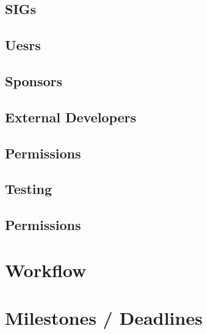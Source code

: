 \documentclass{article}
\begin{document}
\subsection{SIGs}
\subsection{Uesrs}
\subsection{Sponsors}
\subsection{External Developers}
\subsection{Permissions}
\subsection{Testing}
\subsection{Permissions}

\section{Workflow}

\section{Milestones / Deadlines}
\end{document}
